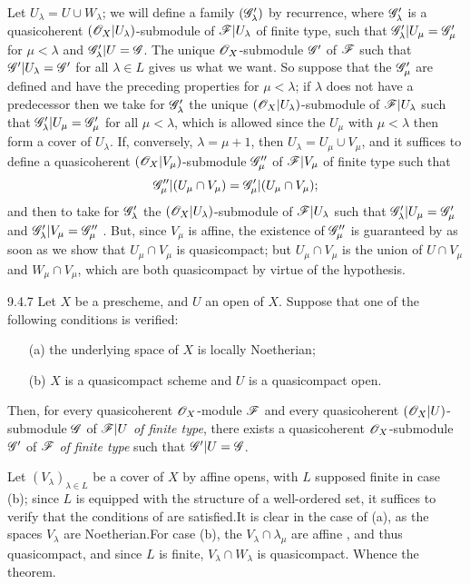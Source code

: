 \documentclass[10pt,oneside]{book}
\begin{document}
Let $U_\lambda=U\cup W_\lambda$; we will define a family $(\mathscr{G}'_\lambda)$
by recurrence, where $\mathscr{G}'_\lambda$ is a quasicoherent
$(\mathscr{O}_X|U_\lambda)$-submodule of $\mathscr{F}|U_\lambda$ of finite type, such that
$\mathscr{G}'_\lambda|U_\mu=\mathscr{G}'_\mu$ for $\mu<\lambda$ and
$\mathscr{G}'_\lambda|U=\mathscr{G}$. The unique $\mathscr{O}_X$-submodule $\mathscr{G}'$ of
$\mathscr{F}$ such that $\mathscr{G}'|U_\lambda=\mathscr{G}'$ for all $\lambda\in L$
 gives us what we want. So suppose that the $\mathscr{G}'_\mu$
are defined and have the preceding properties for $\mu<\lambda$; if $\lambda$
does not have a predecessor then we take for $\mathscr{G}'_\lambda$ the unique
$(\mathscr{O}_X|U_\lambda)$-submodule of $\mathscr{F}|U_\lambda$ such that
$\mathscr{G}'_\lambda|U_\mu=\mathscr{G}'_\mu$ for all $\mu<\lambda$, which is
allowed since the $U_\mu$ with $\mu<\lambda$ then form a cover of $U_\lambda$.
If, conversely, $\lambda=\mu+1$, then $U_\lambda=U_\mu\cup V_\mu$, and it
suffices to define a quasicoherent $(\mathscr{O}_X|V_\mu)$-submodule $\mathscr{G}''_\mu$
of $\mathscr{F}|V_\mu$ of finite type such that
\[
  \mathscr{G}''_\mu|(U_\mu\cap V_\mu)=\mathscr{G}'_\mu|(U_\mu\cap V_\mu);
\]
and then to take for $\mathscr{G}'_\lambda$ the
$(\mathscr{O}_X|U_\lambda)$-submodule of $\mathscr{F}|U_\lambda$ such that
$\mathscr{G}'_\lambda|U_\mu=\mathscr{G}'_\mu$ and
$\mathscr{G}'_\lambda|V_\mu=\mathscr{G}''_\mu$ . But, since
$V_\mu$ is affine, the existence of $\mathscr{G}''_\mu$ is guaranteed by 
as soon as we show that $U_\mu\cap V_\mu$ is quasicompact; but $U_\mu\cap V_\mu$
is the union of $U\cap V_\mu$ and $W_\mu\cap V_\mu$, which are both
quasicompact by virtue of the hypothesis.

\begin{envs}[Theorem]{9.4.7}
\label{thm-1.9.4.7}
Let $X$ be a prescheme, and $U$ an open of $X$.
Suppose that one of the following conditions is verified:
\begin{itemize}
  \item[(a)] the underlying space of $X$ is locally Noetherian;
  \item[(b)] $X$ is a quasicompact scheme and $U$ is a quasicompact open.
\end{itemize}
Then, for every quasicoherent $\mathscr{O}_X$-module $\mathscr{F}$ and every quasicoherent
$(\mathscr{O}_X|U)$-submodule $\mathscr{G}$ of $\mathscr{F}|U$ \emph{of finite type}, there exists a
quasicoherent $\mathscr{O}_X$-submodule $\mathscr{G}'$ of $\mathscr{F}$ \emph{of finite type}
such that $\mathscr{G}'|U=\mathscr{G}$.
\end{envs}

Let
$(V_\lambda)_{\lambda\in L}$ be a cover of $X$ by affine opens,
with $L$ supposed finite in case (b); since $L$ is equipped with the
structure of a well-ordered set, it suffices to verify that the conditions of
 are satisfied.It is clear in the case of (a), as the spaces
$V_\lambda$ are Noetherian.For case (b), the $V_\lambda\cap\lambda_\mu$
are affine , and thus quasicompact, and since $L$ is finite,
$V_\lambda\cap W_\lambda$ is quasicompact. Whence the theorem.
\end{document}
